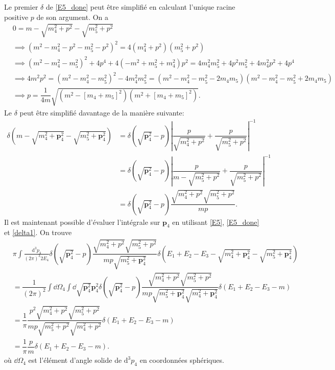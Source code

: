 \begin{enumerate}
    Le premier $\delta$ de \eqref{E5_done} peut être simplifié en calculant l'unique racine positive $p$ de son argument. On a 
    \begin{align*}
        &0 = m-\sqrt{m^2_4 + p^2}-\sqrt{m^2_5 + p^2}\\
        &\implies (m^2 - m^2_4 - p^2 - m^2_5 - p^2)^2=  4(m^2_4 + p^2)(m^2_5 + p^2)\\
        &\implies (m^2 - m^2_4 - m^2_5)^2 + 4p^4 + 4 (-m^2 + m_5^2+m_4^2) p^2 = 4m^2_4 m^2_5 + 4p^2 m^2_5 + 4 m^2_4 p^2  + 4p^4\\
        &\implies 4 m^2p^2 = (m^2 - m^2_4 - m^2_5)^2 - 4 m_4^2 m^2_5 = (m^2 - m^2_4 - m^2_5 - 2 m_4 m_5) (m^2 - m^2_4 - m^2_5 + 2 m_4 m_5)\\
        &\implies p = \dfrac{1}{4m}\sqrt{(m^2 - [m_4 + m_5]^2) (m^2 + [m_4 + m_5]^2)}.
    \end{align*}
    Le $\delta$ peut être simplifié davantage de la manière suivante: 
    \begin{align}
        \delta\left(m-\sqrt{m^2_4 + \mathbf{p}_4^2}-\sqrt{m^2_5 + \mathbf{p}_4^2}\right) &= \delta\left(\sqrt{\mathbf{p}_4^2} - p\right) \left| \dfrac{p}{\sqrt{m^2_4 + p^2}}+\dfrac{p}{\sqrt{m^2_5 + p^2}}\right|^{-1}\nonumber\\
        &= \delta\left(\sqrt{\mathbf{p}_4^2} - p\right) \left|\dfrac{p}{m -\sqrt{m^2_5 + p^2}}+\dfrac{p}{\sqrt{m^2_5 + p^2}}\right|^{-1}\nonumber\\
        &= \delta\left(\sqrt{\mathbf{p}_4^2} - p\right) \dfrac{\sqrt{m^2_4 + p^2} \sqrt{m^2_5 + p^2}}{m p} \label{delta1}. 
    \end{align}
    Il est maintenant possible d'évaluer l'intégrale sur $\mathbf{p}_4$ en utilisant \eqref{E5}, \eqref{E5_done} et \eqref{delta1}. On trouve
    \begin{align}
        &\pi \int \frac{\mathrm{d}^3 p_4}{(2 \pi)^3 2 E_4}  \delta\left(\sqrt{\mathbf{p}_4^2} - p\right) \dfrac{\sqrt{m^2_4 + p^2} \sqrt{m^2_5 + p^2}}{m p \sqrt{m^2_5 + \mathbf{p}_4^2}} \delta\left(E_1 + E_2 - E_3 -\sqrt{m^2_4 + \mathbf{p}_4^2}-\sqrt{m^2_5 + \mathbf{p}_4^2}\right)\nonumber\\
        &= \dfrac{1}{(2\pi)^2} \int \dd \Omega_4\int  \dd\sqrt{\mathbf{p}_4^2}  \mathbf{p}_4^2 \delta\left(\sqrt{\mathbf{p}_4^2} - p\right) \dfrac{\sqrt{m^2_4 + p^2} \sqrt{m^2_5 + p^2}}{m p \sqrt{m^2_5 + \mathbf{p}_4^2}\sqrt{m^2_4 + \mathbf{p}_4^2}} \delta\left(E_1 + E_2 - E_3 - m\right)\nonumber\\
        &= \dfrac{1}{\pi} \dfrac{p^2 \sqrt{m^2_4 + p^2} \sqrt{m^2_5 + p^2}}{m p \sqrt{m^2_5 + p^2}\sqrt{m^2_4 + p^2}} \delta\left(E_1 + E_2 - E_3 - m\right)\nonumber\\
        &= \dfrac{1}{\pi} \dfrac{p}{m} \delta\left(E_1 + E_2 - E_3 - m\right). \label{E4_done}
    \end{align}
    où $\dd \Omega_4$ est l'élément d'angle solide de $\mathrm{d}^3 p_4$ en coordonnées sphériques.


\end{enumerate}

